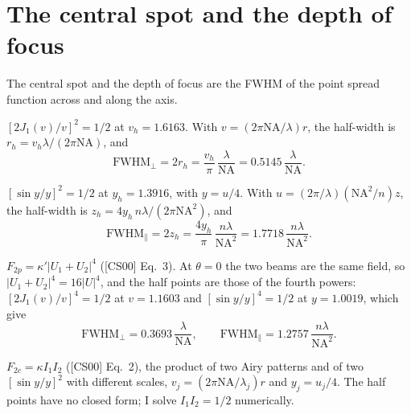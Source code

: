 \documentclass[11pt]{article}
\begin{document}
\section{The central spot and the depth of focus}
The central spot and the depth of focus are the FWHM of the point spread function across and along the axis.

 $[2J_1(v)/v]^2 = 1/2$ at $v_h = 1.6163$. With $v = (2\pi\mathrm{NA}/\lambda)r$,
the half-width is $r_h = v_h\lambda/(2\pi\mathrm{NA})$, and
\begin{equation}\text{FWHM}_\perp = 2r_h = \frac{v_h}{\pi}\,\frac{\lambda}{\mathrm{NA}} = 0.5145\,\frac{\lambda}{\mathrm{NA}} .\end{equation}

 $[\sin y/y]^2 = 1/2$ at $y_h = 1.3916$, with $y = u/4$. With
$u = (2\pi/\lambda)(\mathrm{NA}^2/n)z$, the half-width is $z_h = 4y_h\,n\lambda/(2\pi\mathrm{NA}^2)$, and
\begin{equation}\text{FWHM}_\parallel = 2z_h = \frac{4y_h}{\pi}\,\frac{n\lambda}{\mathrm{NA}^2}
= 1.7718\,\frac{n\lambda}{\mathrm{NA}^2} .\end{equation}

 $F_{2p} = \kappa'|U_1 + U_2|^4$ ([CS00] Eq.~3). At $\theta = 0$ the two beams
are the same field, so $|U_1 + U_2|^4 = 16|U|^4$, and the half points are those of the fourth powers:
$[2J_1(v)/v]^4 = 1/2$ at $v = 1.1603$ and $[\sin y/y]^4 = 1/2$ at $y = 1.0019$, which give
\begin{equation}\text{FWHM}_\perp = 0.3693\,\frac{\lambda}{\mathrm{NA}},\qquad
\text{FWHM}_\parallel = 1.2757\,\frac{n\lambda}{\mathrm{NA}^2} .\end{equation}

 $F_{2c} = \kappa I_1I_2$ ([CS00] Eq.~2), the product of two Airy patterns and
of two $[\sin y/y]^2$ with different scales, $v_j = (2\pi\mathrm{NA}/\lambda_j)r$ and $y_j = u_j/4$. The half points
have no closed form; I solve $I_1I_2 = 1/2$ numerically.

\end{document}
